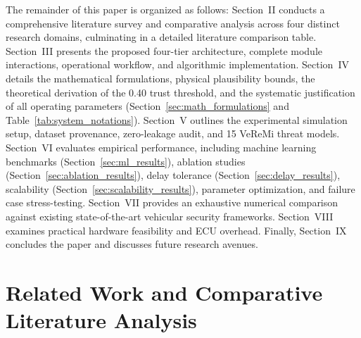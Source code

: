 \documentclass[conference]{IEEEtran}
\begin{document}
The remainder of this paper is organized as follows: Section~II conducts a comprehensive literature survey and comparative analysis across four distinct research domains, culminating in a detailed literature comparison table. Section~III presents the proposed four-tier architecture, complete module interactions, operational workflow, and algorithmic implementation. Section~IV details the mathematical formulations, physical plausibility bounds, the theoretical derivation of the 0.40 trust threshold, and the systematic justification of all operating parameters (Section~\ref{sec:math_formulations} and Table~\ref{tab:system_notations}). Section~V outlines the experimental simulation setup, dataset provenance, zero-leakage audit, and 15 VeReMi threat models. Section~VI evaluates empirical performance, including machine learning benchmarks (Section~\ref{sec:ml_results}), ablation studies (Section~\ref{sec:ablation_results}), delay tolerance (Section~\ref{sec:delay_results}), scalability (Section~\ref{sec:scalability_results}), parameter optimization, and failure case stress-testing. Section~VII provides an exhaustive numerical comparison against existing state-of-the-art vehicular security frameworks. Section~VIII examines practical hardware feasibility and ECU overhead. Finally, Section~IX concludes the paper and discusses future research avenues.


\section{Related Work and Comparative Literature Analysis}
\end{document}
